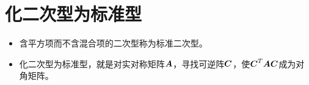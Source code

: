 \section{化二次型为标准型}

\begin{frame}
  
    \begin{itemize}
    \item 含平方项而不含混合项的二次型称为标准二次型。\\[0.2cm]
    \item 化二次型为标准型，就是对实对称矩阵$\boldsymbol{A}$，寻找可逆阵$\boldsymbol{C}$，使$\boldsymbol{C}^T\boldsymbol{A}\boldsymbol{C}$成为对角矩阵。
    \end{itemize}
  
\end{frame}




% 
